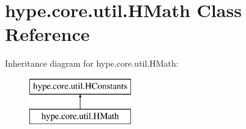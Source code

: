 \hypertarget{classhype_1_1core_1_1util_1_1_h_math}{\section{hype.\-core.\-util.\-H\-Math Class Reference}
\label{classhype_1_1core_1_1util_1_1_h_math}
}
Inheritance diagram for hype.\-core.\-util.\-H\-Math\-:\begin{figure}[H]
\begin{center}
\leavevmode
\includegraphics[height=2.000000cm]{classhype_1_1core_1_1util_1_1_h_math}
\end{center}
\end{figure}
